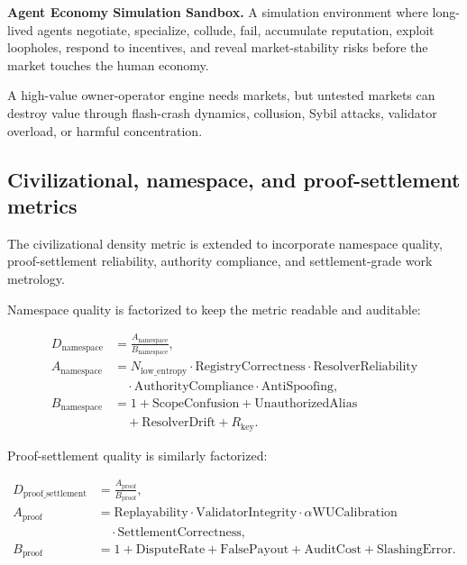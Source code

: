 \documentclass[
  11pt,
]{article}
\begin{document}
\textbf{Agent Economy Simulation Sandbox.} A simulation environment
where long-lived agents negotiate, specialize, collude, fail, accumulate
reputation, exploit loopholes, respond to incentives, and reveal
market-stability risks before the market touches the human economy.

A high-value owner-operator engine needs markets, but untested markets
can destroy value through flash-crash dynamics, collusion, Sybil
attacks, validator overload, or harmful concentration.

\subsection{Civilizational, namespace, and proof-settlement
metrics}\label{civilizational-namespace-and-proof-settlement-metrics}

The civilizational density metric is extended to incorporate namespace
quality, proof-settlement reliability, authority compliance, and
settlement-grade work metrology.

Namespace quality is factorized to keep the metric readable and
auditable:

\[
\begin{aligned}
D_{\mathrm{namespace}}&=\frac{A_{\mathrm{namespace}}}{B_{\mathrm{namespace}}},\\
A_{\mathrm{namespace}}&=N_{\mathrm{low\_entropy}}
\cdot\mathrm{RegistryCorrectness}\cdot\mathrm{ResolverReliability}\\
&\quad\cdot\mathrm{AuthorityCompliance}\cdot\mathrm{AntiSpoofing},\\
B_{\mathrm{namespace}}&=1+\mathrm{ScopeConfusion}+\mathrm{UnauthorizedAlias}\\
&\quad+\mathrm{ResolverDrift}+R_{\mathrm{key}}.
\end{aligned}
\]

Proof-settlement quality is similarly factorized:

\[
\begin{aligned}
D_{\mathrm{proof\_settlement}}&=\frac{A_{\mathrm{proof}}}{B_{\mathrm{proof}}},\\
A_{\mathrm{proof}}&=\mathrm{Replayability}\cdot\mathrm{ValidatorIntegrity}
\cdot\alpha\mathrm{WUCalibration}\\
&\quad\cdot\mathrm{SettlementCorrectness},\\
B_{\mathrm{proof}}&=1+\mathrm{DisputeRate}+\mathrm{FalsePayout}+
\mathrm{AuditCost}+\mathrm{SlashingError}.
\end{aligned}
\]
\end{document}
